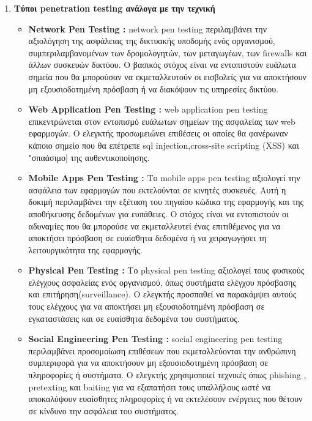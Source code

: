 {\begin{enumerate}
\begin{itemize}
    \end{itemize}
    \item{\textbf{ Τύποι \lt penetration testing \gt ανάλογα με την τεχνική}}
    \begin{itemize}
        \item \lt \textbf{Network Pen Testing :}  \lt network pen testing \gt περιλαμβάνει την αξιολόγηση της ασφάλειας της δικτυακής υποδομής ενός οργανισμού, συμπεριλαμβανομένων των δρομολογητών, των μεταγωγέων, των \lt firewalls \gt και άλλων συσκευών δικτύου. Ο βασικός στόχος είναι να εντοπιστούν ευάλωτα σημεία που θα μπορούσαν να εκμεταλλευτούν οι εισβολείς για να αποκτήσουν μη εξουσιοδοτημένη πρόσβαση ή να διακόψουν τις υπηρεσίες δικτύου.  

       
        \item \lt \textbf{Web Application Pen Testing :} \gt  \lt web application pen testing \gt επικεντρώνεται στον εντοπισμό ευάλωτων σημείων της ασφαλείας των \lt web \gt εφαρμογών. Ο ελεγκτής προσωμειώνει επιθέσεις οι οποίες θα φανέρωναν κάποιο σημείο που θα επέτρεπε \lt sql injection,cross-site scripting (XSS) και "σπαάσιμο| της αυθεντικοποίησης.
        \item \lt \textbf{Mobile Apps Pen Testing :} \gt Το \lt mobile apps pen testing \gt αξιολογεί την ασφάλεια των εφαρμογών που εκτελούνται σε κινητές συσκευές. Αυτή η δοκιμή περιλαμβάνει την εξέταση του πηγαίου κώδικα της εφαρμογής και της αποθήκευσης δεδομένων για ευπάθειες. Ο στόχος είναι να εντοπιστούν οι αδυναμίες που θα μπορούσε να εκμεταλλευτεί ένας επιτιθέμενος για να αποκτήσει πρόσβαση σε ευαίσθητα δεδομένα ή να χειραγωγήσει τη λειτουργικότητα της εφαρμογής.
        \item \lt \textbf{Physical Pen Testing :} \gt Το \lt physical pen testing \gt αξιολογεί τους φυσικούς ελέγχους ασφαλείας ενός οργανισμού, όπως συστήματα ελέγχου πρόσβασης και επιτήρηση(\lt surveillance)\gt. Ο ελεγκτής προσπαθεί να παρακάμψει αυτούς τους ελέγχους για να αποκτήσει μη εξουσιοδοτημένη πρόσβαση σε εγκαταστάσεις και σε ευαίσθητα δεδομένα του συστήματος. 
        \item \lt \textbf{Social Engineering Pen Testing :}  \lt social engineering pen testing \gt περιλαμβάνει προσομοίωση επιθέσεων που εκμεταλλεύονται την ανθρώπινη συμπεριφορά για να αποκτήσουν μη εξουσιοδοτημένη πρόσβαση σε πληροφορίες ή συστήματα. Ο ελεγκτής χρησιμοποιεί τεχνικές όπως  \lt phishing ,   pretexting \gt και \lt baiting \gt για να εξαπατήσει τους υπαλλήλους ωστέ να αποκαλύψουν ευαίσθητες πληροφορίες ή να εκτελέσουν ενέργειες που θέτουν σε κίνδυνο την ασφάλεια του συστήματος. 
        

\end{itemize}
\end{enumerate}}
